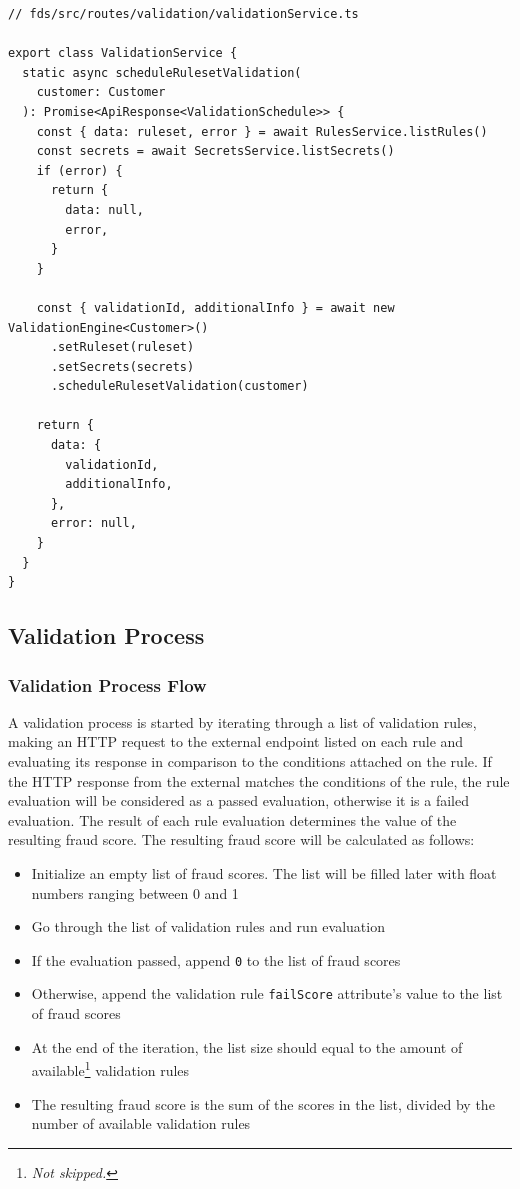     \begin{lstlisting}[style=es6, caption={ValidationService schedule validation implementation (TypeScript)}]
// fds/src/routes/validation/validationService.ts

export class ValidationService {
  static async scheduleRulesetValidation(
    customer: Customer
  ): Promise<ApiResponse<ValidationSchedule>> {
    const { data: ruleset, error } = await RulesService.listRules()
    const secrets = await SecretsService.listSecrets()
    if (error) {
      return {
        data: null,
        error,
      }
    }

    const { validationId, additionalInfo } = await new ValidationEngine<Customer>()
      .setRuleset(ruleset)
      .setSecrets(secrets)
      .scheduleRulesetValidation(customer)

    return {
      data: {
        validationId,
        additionalInfo,
      },
      error: null,
    }
  }
}
    \end{lstlisting}

  \subsection{Validation Process}
    \label{sub:process}

    \subsubsection{Validation Process Flow}
    
      A validation process is started by iterating through a list of validation rules, making an HTTP request to the external endpoint listed on each rule and evaluating its response in comparison to the conditions attached on the rule. If the HTTP response from the external matches the conditions of the rule, the rule evaluation will be considered as a passed evaluation, otherwise it is a failed evaluation. The result of each rule evaluation determines the value of the resulting fraud score. The resulting fraud score will be calculated as follows: 

      \begin{itemize}
        \item Initialize an empty list of fraud scores. The list will be filled later with float numbers ranging between 0 and 1
        \item Go through the list of validation rules and run evaluation
        \item If the evaluation passed, append \verb;0; to the list of fraud scores
        \item Otherwise, append the validation rule \verb;failScore; attribute's value to the list of fraud scores
        \item At the end of the iteration, the list size should equal to the amount of available\footnote{\emph{Not skipped.}} validation rules
        \item The resulting fraud score is the sum of the scores in the list, divided by the number of available validation rules
      \end{itemize}
      
